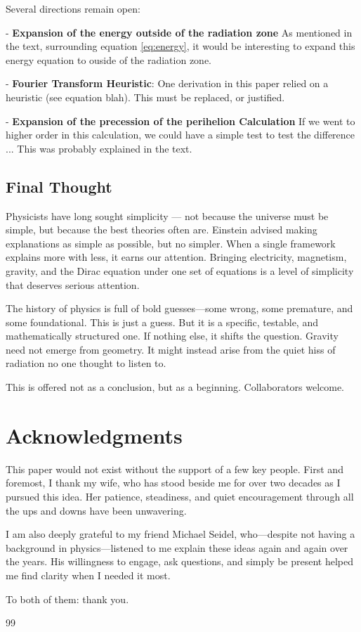 \documentclass {article}
\begin{document}
Several directions remain open:

- \textbf{Expansion of the energy outside of the radiation zone} As mentioned in the text, surrounding equation \ref{eq:energy}, it would be interesting to expand this energy equation to ouside of the radiation zone.

- \textbf{Fourier Transform Heuristic}: One derivation in this paper relied on a heuristic (see equation blah). This must be replaced, or justified.

- \textbf{Expansion of the precession of the perihelion Calculation} If we went to higher order in this calculation, we could have a simple test to test the difference ... This was probably explained in the text.


\subsection{Final Thought}

Physicists have long sought simplicity — not because the universe must be simple, but because the best theories often are. Einstein advised making explanations as simple as possible, but no simpler. When a single framework explains more with less, it earns our attention. Bringing electricity, magnetism, gravity, and the Dirac equation under one set of equations is a level of simplicity that deserves serious attention.

The history of physics is full of bold guesses—some wrong, some premature, and some foundational. This is just a guess. But it is a specific, testable, and mathematically structured one. If nothing else, it shifts the question. Gravity need not emerge from geometry. It might instead arise from the quiet hiss of radiation no one thought to listen to.

This is offered not as a conclusion, but as a beginning. Collaborators welcome.


\section*{Acknowledgments}

This paper would not exist without the support of a few key people. First and foremost, I thank my wife, who has stood beside me for over two decades as I pursued this idea. Her patience, steadiness, and quiet encouragement through all the ups and downs have been unwavering.

I am also deeply grateful to my friend Michael Seidel, who—despite not having a background in physics—listened to me explain these ideas again and again over the years. His willingness to engage, ask questions, and simply be present helped me find clarity when I needed it most.

To both of them: thank you.



\begin{thebibliography}{99}
	

	
\end{thebibliography}
\end{document}
